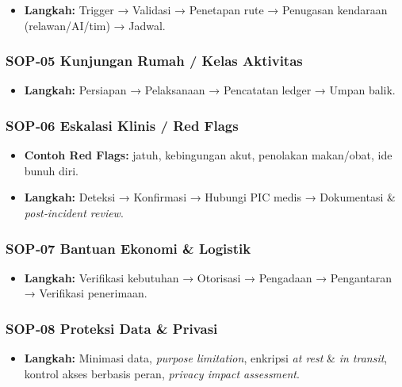 \documentclass[
  letterpaper,
  DIV=11,
  numbers=noendperiod]{scrartcl}
\providecommand{\tightlist}{%
  \setlength{\itemsep}{0pt}\setlength{\parskip}{0pt}}
\begin{document}
\begin{itemize}
\tightlist
\item
  \textbf{Langkah:} Trigger → Validasi → Penetapan rute → Penugasan
  kendaraan (relawan/AI/tim) → Jadwal.
\end{itemize}

\subsubsection{SOP‑05 Kunjungan Rumah / Kelas
Aktivitas}\label{sop05-kunjungan-rumah-kelas-aktivitas}

\begin{itemize}
\tightlist
\item
  \textbf{Langkah:} Persiapan → Pelaksanaan → Pencatatan ledger → Umpan
  balik.
\end{itemize}

\subsubsection{SOP‑06 Eskalasi Klinis / Red
Flags}\label{sop06-eskalasi-klinis-red-flags}

\begin{itemize}
\tightlist
\item
  \textbf{Contoh Red Flags:} jatuh, kebingungan akut, penolakan
  makan/obat, ide bunuh diri.
\item
  \textbf{Langkah:} Deteksi → Konfirmasi → Hubungi PIC medis →
  Dokumentasi \& \emph{post‑incident review}.
\end{itemize}

\subsubsection{SOP‑07 Bantuan Ekonomi \&
Logistik}\label{sop07-bantuan-ekonomi-logistik}

\begin{itemize}
\tightlist
\item
  \textbf{Langkah:} Verifikasi kebutuhan → Otorisasi → Pengadaan →
  Pengantaran → Verifikasi penerimaan.
\end{itemize}

\subsubsection{SOP‑08 Proteksi Data \&
Privasi}\label{sop08-proteksi-data-privasi}

\begin{itemize}
\tightlist
\item
  \textbf{Langkah:} Minimasi data, \emph{purpose limitation}, enkripsi
  \emph{at rest} \& \emph{in transit}, kontrol akses berbasis peran,
  \emph{privacy impact assessment}.
\end{itemize}
\end{document}

